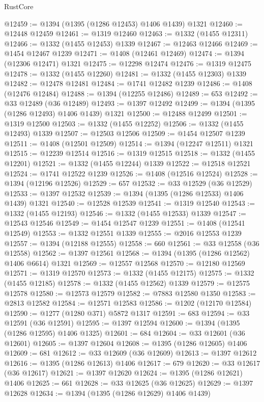 \begin{lexlean}{RustCore}
\begin{coremodule}
@12459 := @1394 (@1395 (@1286 @12453) @1406 @1439) @1321
@12460 := @12448 @12459
@12461 := @1319 @12460
@12463 := @1332 (@1455 @12311)
@12466 := @1332 (@1455 @12453) @1339
@12467 := @12463 @12466
@12469 := @1454 @12467 @1239
@12471 := @1408 (@12461 @12469)
@12474 := @1394 (@12306 @12471) @1321
@12475 := @12298 @12474
@12476 := @1319 @12475
@12478 := @1332 (@1455 @12260)
@12481 := @1332 (@1455 @12303) @1339
@12482 := @12478 @12481
@12484 := @1741 @12482 @1239
@12486 := @1408 (@12476 @12484)
@12488 := @1394 (@12255 @12486)
@12489 := 653
@12492 := @33 @12489 (@36 @12489)
@12493 := @1397 @12492
@12499 := @1394 (@1395 (@1286 @12493) @1406 @1439) @1321
@12500 := @12488 @12499
@12501 := @1319 @12500
@12503 := @1332 (@1455 @12252)
@12506 := @1332 (@1455 @12493) @1339
@12507 := @12503 @12506
@12509 := @1454 @12507 @1239
@12511 := @1408 (@12501 @12509)
@12514 := @1394 (@12247 @12511) @1321
@12515 := @12239 @12514
@12516 := @1319 @12515
@12518 := @1332 (@1455 @12201)
@12521 := @1332 (@1455 @12244) @1339
@12522 := @12518 @12521
@12524 := @1741 @12522 @1239
@12526 := @1408 (@12516 @12524)
@12528 := @1394 (@12196 @12526)
@12529 := 657
@12532 := @33 @12529 (@36 @12529)
@12533 := @1397 @12532
@12539 := @1394 (@1395 (@1286 @12533) @1406 @1439) @1321
@12540 := @12528 @12539
@12541 := @1319 @12540
@12543 := @1332 (@1455 @12193)
@12546 := @1332 (@1455 @12533) @1339
@12547 := @12543 @12546
@12549 := @1454 @12547 @1239
@12551 := @1408 (@12541 @12549)
@12553 := @1332 @12551 @1339
@12555 := @2016 @12553 @1239
@12557 := @1394 (@12188 @12555)
@12558 := 660
@12561 := @33 @12558 (@36 @12558)
@12562 := @1397 @12561
@12568 := @1394 (@1395 (@1286 @12562) @1406 @6614) @1321
@12569 := @12557 @12568
@12570 := @12180 @12569
@12571 := @1319 @12570
@12573 := @1332 (@1455 @12175)
@12575 := @1332 (@1455 @12185)
@12578 := @1332 (@1455 @12562) @1339
@12579 := @12575 @12578
@12580 := @12573 @12579
@12582 := @7883 @12580 @1350
@12583 := @2813 @12582
@12584 := @12571 @12583
@12586 := @1202 (@12170 @12584)
@12590 := @1277 (@1280 @371) @5872 @1317
@12591 := 683
@12594 := @33 @12591 (@36 @12591)
@12595 := @1397 @12594
@12600 := @1394 (@1395 (@1286 @12595) @1406 @1325)
@12601 := 684
@12604 := @33 @12601 (@36 @12601)
@12605 := @1397 @12604
@12608 := @1395 (@1286 @12605) @1406
@12609 := 681
@12612 := @33 @12609 (@36 @12609)
@12613 := @1397 @12612
@12616 := @1395 (@1286 @12613) @1406
@12617 := 679
@12620 := @33 @12617 (@36 @12617)
@12621 := @1397 @12620
@12624 := @1395 (@1286 @12621) @1406
@12625 := 661
@12628 := @33 @12625 (@36 @12625)
@12629 := @1397 @12628
@12634 := @1394 (@1395 (@1286 @12629) @1406 @1439)

\end{coremodule}
\end{lexlean}
